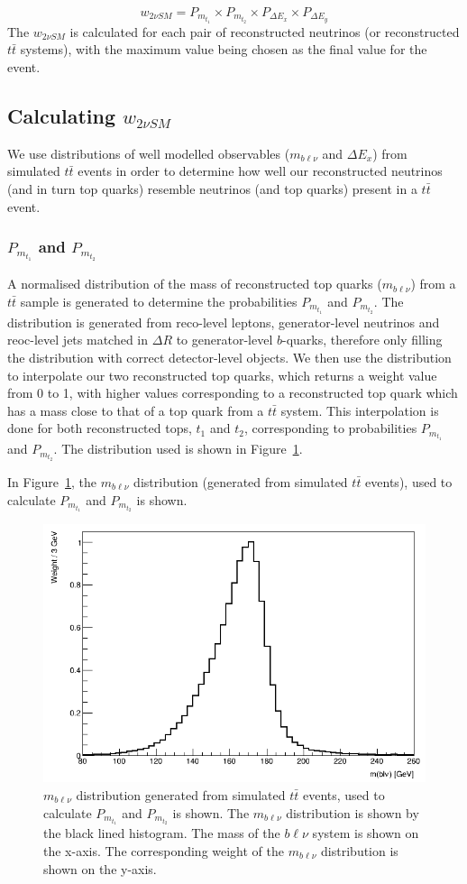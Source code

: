 \begin{equation}
    w_{2\nu SM} = P_{m_{t_{1}}} \times P_{m_{t_{2}}} \times P_{\Delta E_{x}} \times P_{\Delta E_{y}}
\end{equation}
The $w_{2\nu SM}$ is calculated for each pair of reconstructed neutrinos (or reconstructed $t\bar{t}$ systems), with the maximum value being chosen as the final value for the event.

\subsection{Calculating $w_{2\nu SM}$}
We use distributions of well modelled observables ($m_{b\ell\nu}$ and $\Delta E_{x}$) from simulated $t\bar{t}$ events in order to determine how well our reconstructed neutrinos (and in turn top quarks) resemble neutrinos (and top quarks) present in a $t\bar{t}$ event.
\subsubsection{$P_{m_{t_{1}}}$ and $P_{m_{t_{2}}}$}
A normalised distribution of the mass of reconstructed top quarks ($m_{b\ell\nu}$) from a $t\bar{t}$ sample is generated to determine the probabilities $P_{m_{t_{1}}}$ and $P_{m_{t_{2}}}$. The distribution is generated from reco-level leptons, generator-level neutrinos and reoc-level jets matched in $\Delta R$ to generator-level $b$-quarks, therefore only filling the distribution with correct detector-level objects. We then use the distribution to interpolate our two reconstructed top quarks, which returns a weight value from 0 to 1, with higher values corresponding to a reconstructed top quark which has a mass close to that of a top quark from a $t\bar{t}$ system. This interpolation is done for both reconstructed tops, $t_{1}$ and $t_{2}$, corresponding to probabilities $P_{m_{t_{1}}}$ and $P_{m_{t_{2}}}$. The distribution used is shown in Figure~\ref{fig:2vSM-mass-dist}.

In Figure~\ref{fig:2vSM-mass-dist}, the $m_{b\ell\nu}$ distribution (generated from simulated $t\bar{t}$ events), used to calculate $P_{m_{t_{1}}}$ and $P_{m_{t_{2}}}$ is shown.

\begin{figure}[h!]
	\includegraphics[width=0.6\linewidth]{figures/mtop_2vSM.png}
	\centering
	\caption{$m_{b\ell\nu}$ distribution generated from simulated $t\bar{t}$ events, used to calculate $P_{m_{t_{1}}}$ and $P_{m_{t_{2}}}$ is shown. The $m_{b\ell\nu}$ distribution is shown by the black lined histogram. The mass of the $b\ell\nu$ system is shown on the x-axis. The corresponding weight of the $m_{b\ell\nu}$ distribution is shown on the y-axis.}
	\label{fig:2vSM-mass-dist}
\end{figure}
